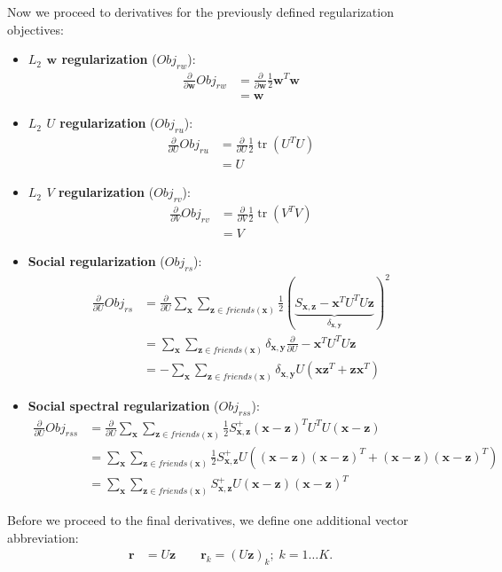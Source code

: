 \documentclass[11pt,a4paper]{article}
\newcommand{\Obj}{\mathit{Obj}}
\newcommand{\ru}{\mathit{ru}}
\newcommand{\rv}{\mathit{rv}}
\newcommand{\rw}{\mathit{rw}}
\newcommand{\rs}{\mathit{rs}}
\newcommand{\rss}{\mathit{rss}}
\newcommand{\tr}{\operatorname{tr}}
\newcommand{\x}{\vec{x}}
\newcommand{\y}{\vec{y}}
\newcommand{\z}{\vec{z}}
\newcommand{\w}{\vec{w}}
\renewcommand{\r}{\vec{r}}
\renewcommand{\vec}[1]{\mathbf{#1}}
\begin{document}
Now we proceed to derivatives for the previously defined
regularization objectives:
\begin{itemize}
\item {\bf $L_2$ $\w$ regularization} ($\Obj_\rw$):
\begin{align*}
\frac{\partial}{\partial \w} \Obj_\rw & = \frac{\partial}{\partial \w} \frac{1}{2} \w^T \w\\
& = \w
\end{align*}
\item {\bf $L_2$ $U$ regularization} ($\Obj_\ru$):
\begin{align*}
\frac{\partial}{\partial U} \Obj_\ru & = \frac{\partial}{\partial U} \frac{1}{2} \tr(U^T U) \\
& = U
\end{align*}
\item {\bf $L_2$ $V$ regularization} ($\Obj_\rv$):
\begin{align*}
\frac{\partial}{\partial V} \Obj_\rv & = \frac{\partial}{\partial V} \frac{1}{2} \tr(V^T V) \\
& = V
\end{align*}
\item {\bf Social regularization} ($\Obj_\rs$):
\begin{align*}
\frac{\partial}{\partial U} \Obj_\rs & = \frac{\partial}{\partial U} \sum_{\x} \sum_{\z \in \mathit{friends}(\x)} \frac{1}{2} \left( \underbrace{S_{\x,\z} - \x^T U^T U \z}_{\delta_{\x,\y}} \right)^2 \\
& = \sum_{\x} \sum_{\z \in \mathit{friends}(\x)} \delta_{\x,\y} \frac{\partial}{\partial U} - \x^T U^T U \z \\
& = - \sum_{\x} \sum_{\z \in \mathit{friends}(\x)} \delta_{\x,\y} U (\x \z^T + \z \x^T)
\end{align*}
\item {\bf Social spectral regularization} ($\Obj_\rss$):
\begin{align*}
\frac{\partial}{\partial U} \Obj_\rss & = \frac{\partial}{\partial U} \sum_{\x} \sum_{\z \in \mathit{friends}(\x)} \frac{1}{2} S^+_{\x,\z} (\x - \z)^T U^T U (\x - \z) \\
& = \sum_{\x} \sum_{\z \in \mathit{friends}(\x)} \frac{1}{2} S^+_{\x,\z} U ((\x - \z)(\x - \z)^T + (\x - \z)(\x - \z)^T)\\
& = \sum_{\x} \sum_{\z \in \mathit{friends}(\x)} S^+_{\x,\z} U (\x - \z)(\x - \z)^T
\end{align*}
\end{itemize}

Before we proceed to the final derivatives, we define one additional
vector abbreviation: 
\begin{align*}
\r & = U \z \qquad \r_{k} = (U \z)_{k}; \; k=1\ldots K .
\end{align*}
\end{document}
